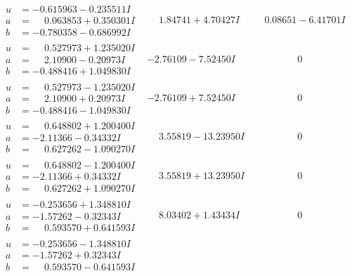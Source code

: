 \documentclass[1p]{elsarticle_modified}
\theoremstyle{definition}
\begin{document}
$$\begin{array}{c|c|c}
\begin{aligned}
u &= -0.615963 - 0.235511 I \\
a &= \phantom{-}0.063853 + 0.350301 I \\
b &= -0.780358 - 0.686992 I\end{aligned}
 & \phantom{-}1.84741 + 4.70427 I & \phantom{-}0.08651 - 6.41701 I \\ \hline\begin{aligned}
u &= \phantom{-}0.527973 + 1.235020 I \\
a &= \phantom{-}2.10900 - 0.20973 I \\
b &= -0.488416 + 1.049830 I\end{aligned}
 & -2.76109 - 7.52450 I & \phantom{-0.000000 } 0 \\ \hline\begin{aligned}
u &= \phantom{-}0.527973 - 1.235020 I \\
a &= \phantom{-}2.10900 + 0.20973 I \\
b &= -0.488416 - 1.049830 I\end{aligned}
 & -2.76109 + 7.52450 I & \phantom{-0.000000 } 0 \\ \hline\begin{aligned}
u &= \phantom{-}0.648802 + 1.200400 I \\
a &= -2.11366 - 0.34332 I \\
b &= \phantom{-}0.627262 - 1.090270 I\end{aligned}
 & \phantom{-}3.55819 - 13.23950 I & \phantom{-0.000000 } 0 \\ \hline\begin{aligned}
u &= \phantom{-}0.648802 - 1.200400 I \\
a &= -2.11366 + 0.34332 I \\
b &= \phantom{-}0.627262 + 1.090270 I\end{aligned}
 & \phantom{-}3.55819 + 13.23950 I & \phantom{-0.000000 } 0 \\ \hline\begin{aligned}
u &= -0.253656 + 1.348810 I \\
a &= -1.57262 - 0.32343 I \\
b &= \phantom{-}0.593570 + 0.641593 I\end{aligned}
 & \phantom{-}8.03402 + 1.43434 I & \phantom{-0.000000 } 0 \\ \hline\begin{aligned}
u &= -0.253656 - 1.348810 I \\
a &= -1.57262 + 0.32343 I \\
b &= \phantom{-}0.593570 - 0.641593 I\end{aligned}

\end{array}$$
\end{document}
